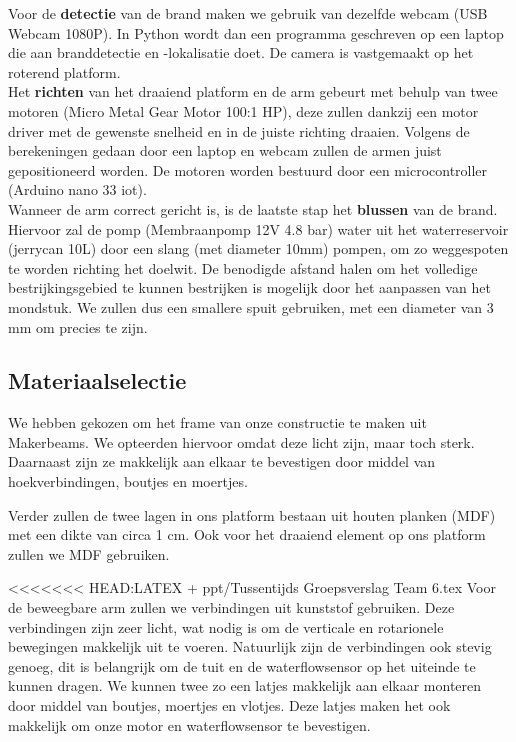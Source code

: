 \documentclass[kulak]{kulakarticle} %
\begin{document}
		Voor de \textbf{detectie} van de brand maken we gebruik van dezelfde webcam (USB Webcam 1080P). In Python wordt dan een programma geschreven op een laptop die aan branddetectie en -lokalisatie doet. De camera is vastgemaakt op het roterend platform. \\
		
		Het \textbf{richten} van het draaiend platform en de arm gebeurt met behulp van twee motoren (Micro Metal Gear Motor 100:1 HP), deze zullen dankzij een motor driver met de gewenste snelheid en in de juiste richting draaien. Volgens de berekeningen gedaan door een laptop en webcam zullen de armen juist gepositioneerd worden. De motoren worden bestuurd door een microcontroller (Arduino nano 33 iot). \\
		
		Wanneer de arm correct gericht is, is de laatste stap het \textbf{blussen} van de brand. Hiervoor zal de pomp (Membraanpomp 12V 4.8 bar) water uit het waterreservoir (jerrycan 10L) door een slang (met diameter 10mm) pompen, om zo weggespoten te worden richting het doelwit. De benodigde afstand halen om het volledige bestrijkingsgebied te kunnen bestrijken is mogelijk door het aanpassen van het mondstuk. We zullen dus een smallere spuit gebruiken, met een diameter van 3 mm om precies te zijn.\\
		
		
	\subsection{Materiaalselectie}
	
		We hebben gekozen om het frame van onze constructie te maken uit Makerbeams. We opteerden hiervoor omdat deze licht zijn, maar toch sterk. Daarnaast zijn ze makkelijk aan elkaar te bevestigen door middel van hoekverbindingen, boutjes en moertjes.
		
		Verder zullen de twee lagen in ons platform bestaan uit houten planken (MDF) met een dikte van circa 1 cm. Ook voor het draaiend element op ons platform zullen we MDF gebruiken.
		
<<<<<<< HEAD:LATEX + ppt/Tussentijds Groepsverslag Team 6.tex
		Voor de beweegbare arm zullen we verbindingen uit kunststof gebruiken. Deze verbindingen zijn zeer licht, wat nodig is om de verticale en rotarionele bewegingen makkelijk uit te voeren. Natuurlijk zijn de verbindingen ook stevig genoeg, dit is belangrijk om de tuit en de waterflowsensor op het uiteinde te kunnen dragen. We kunnen twee zo een latjes makkelijk aan elkaar monteren door middel van boutjes, moertjes en vlotjes. Deze latjes maken het ook makkelijk om onze motor en waterflowsensor te bevestigen.
	
\end{document}
